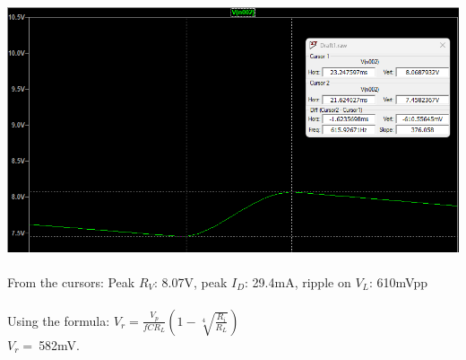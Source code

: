 \documentclass{article}
\begin{document}
\begin{enumerate}
				\includegraphics[scale=0.35]{prelab/problem 2 - 7}\\\\
				From the cursors: Peak \(R_V\): 8.07V, peak \(I_D\): 29.4mA, ripple on \(V_L\): 610mVpp\\\\
				Using the formula: \(V_r = \frac{V_p}{fCR_L} (1- \sqrt[4]{\frac{R_i}{R_L}}) \)\\ 
				\(V_r =\ \)582mV. 
			\end{enumerate}
\end{document}
